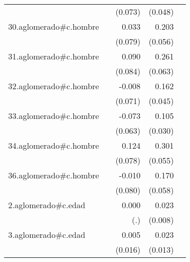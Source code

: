 {\begin{longtable}{l*{4}{D{.}{.}{-1}}}
            &                     &     (0.073)         &     (0.048)         &                     \\
\addlinespace
30.aglomerado#c.hombre&                     &       0.033         &       0.203\sym{***}&                     \\
            &                     &     (0.079)         &     (0.056)         &                     \\
\addlinespace
31.aglomerado#c.hombre&                     &       0.090         &       0.261\sym{***}&                     \\
            &                     &     (0.084)         &     (0.063)         &                     \\
\addlinespace
32.aglomerado#c.hombre&                     &      -0.008         &       0.162\sym{***}&                     \\
            &                     &     (0.071)         &     (0.045)         &                     \\
\addlinespace
33.aglomerado#c.hombre&                     &      -0.073         &       0.105\sym{***}&                     \\
            &                     &     (0.063)         &     (0.030)         &                     \\
\addlinespace
34.aglomerado#c.hombre&                     &       0.124         &       0.301\sym{***}&                     \\
            &                     &     (0.078)         &     (0.055)         &                     \\
\addlinespace
36.aglomerado#c.hombre&                     &      -0.010         &       0.170\sym{**} &                     \\
            &                     &     (0.080)         &     (0.058)         &                     \\
\addlinespace
2.aglomerado#c.edad&                     &       0.000         &       0.023\sym{**} &                     \\
            &                     &         (.)         &     (0.008)         &                     \\
\addlinespace
3.aglomerado#c.edad&                     &       0.005         &       0.023         &                     \\
            &                     &     (0.016)         &     (0.013)         &                     \\

\end{longtable}}
